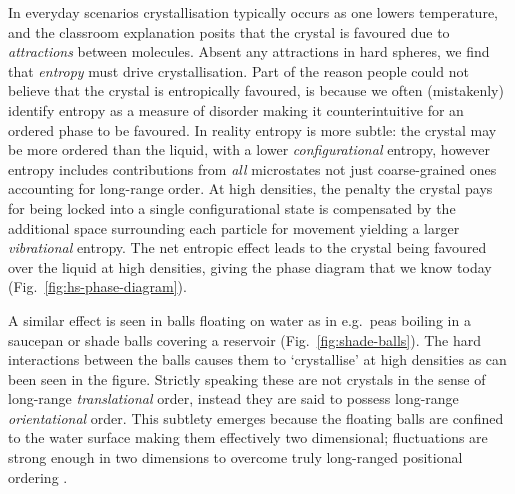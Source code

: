 \documentclass[11pt,twoside]{report}
\begin{document}
In everyday scenarios crystallisation typically occurs as one lowers temperature, and the classroom explanation posits that the crystal is favoured due to \emph{attractions} between molecules.
Absent any attractions in hard spheres, we find that \emph{entropy} must drive crystallisation.
Part of the reason people could not believe that the crystal is entropically favoured, is because we often (mistakenly) identify entropy as a measure of disorder making it counterintuitive for an ordered phase to be favoured.
In reality entropy is more subtle: the crystal may be more ordered than the liquid, with a lower \emph{configurational} entropy, however entropy includes contributions from \emph{all} microstates not just coarse-grained ones accounting for long-range order.
At high densities, the penalty the crystal pays for being locked into a single configurational state is compensated by the additional space surrounding each particle for movement yielding a larger \emph{vibrational} entropy.
The net entropic effect leads to the crystal being favoured over the liquid at high densities, giving the phase diagram that we know today (Fig.\ \ref{fig:hs-phase-diagram}).

A similar effect is seen in balls floating on water as in e.g.\ peas boiling in a saucepan or shade balls covering a reservoir (Fig.\ \ref{fig:shade-balls}).
The hard interactions between the balls causes%
them to `crystallise' at high densities as can been seen in the figure.
Strictly speaking these are not crystals in the sense of long-range \emph{translational} order, instead they are said to possess long-range \emph{orientational} order.
This subtlety emerges because the floating balls are confined to the water surface making them effectively two dimensional; fluctuations are strong enough in two dimensions to overcome truly long-ranged positional ordering \cite{MerminPRL1966,MerminPR1968}.
\end{document}
